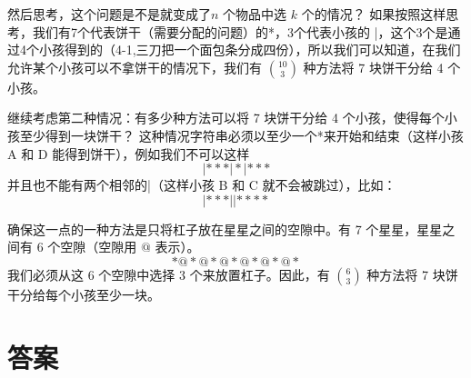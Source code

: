 \documentclass[lang=cn,math=mtpro2,11pt,scheme=chinese,pad]{elegantbook}
\begin{document}
然后思考，这个问题是不是就变成了\(n\) 个物品中选 \(k\) 个的情况？
如果按照这样思考，我们有7个代表饼干（需要分配的问题）的*，3个代表小孩的 |，这个3个是通过4个小孩得到的（4-1,三刀把一个面包条分成四份），所以我们可以知道，在我们允许某个小孩可以不拿饼干的情况下，我们有 \(\binom{10}{3}\) 种方法将 7 块饼干分给 4 个小孩。

继续考虑第二种情况：有多少种方法可以将 7 块饼干分给 4 个小孩，使得每个小孩至少得到一块饼干？
这种情况字符串必须以至少一个*来开始和结束（这样小孩 A 和 D 能得到饼干），例如我们不可以这样
\[
| *** | * | ***
\]
并且也不能有两个相邻的|（这样小孩 B 和 C 就不会被跳过），比如：
\[
| *** | | ****
\]

确保这一点的一种方法是只将杠子放在星星之间的空隙中。有 7 个星星，星星之间有 6 个空隙（空隙用 \(@\) 表示）。
\[
* @ * @ * @ * @ * @ * @ *
\]
我们必须从这 6 个空隙中选择 3 个来放置杠子。因此，有 $\binom{6}{3}$ 种方法将 7 块饼干分给每个小孩至少一块。


\appendix
\chapter{答案}
\end{document}
